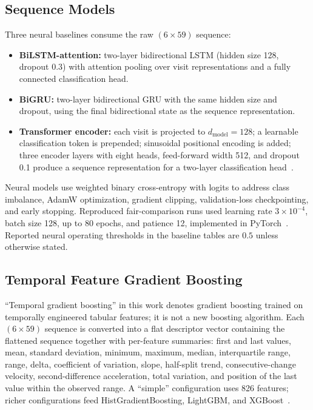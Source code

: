 \documentclass[conference]{IEEEtran}
\begin{document}
\subsection{Sequence Models}
Three neural baselines consume the raw $(6\times 59)$ sequence:
\begin{itemize}
\item \textbf{BiLSTM-attention:} two-layer bidirectional LSTM (hidden size 128, dropout 0.3) with attention pooling over visit representations and a fully connected classification head.
\item \textbf{BiGRU:} two-layer bidirectional GRU with the same hidden size and dropout, using the final bidirectional state as the sequence representation.
\item \textbf{Transformer encoder:} each visit is projected to $d_{\mathrm{model}}=128$; a learnable classification token is prepended; sinusoidal positional encoding is added; three encoder layers with eight heads, feed-forward width 512, and dropout 0.1 produce a sequence representation for a two-layer classification head~\cite{vaswani2017attention}.
\end{itemize}
Neural models use weighted binary cross-entropy with logits to address class imbalance, AdamW optimization, gradient clipping, validation-loss checkpointing, and early stopping. Reproduced fair-comparison runs used learning rate $3\times 10^{-4}$, batch size 128, up to 80 epochs, and patience 12, implemented in PyTorch~\cite{paszke2019pytorch}. Reported neural operating thresholds in the baseline tables are $0.5$ unless otherwise stated.

\subsection{Temporal Feature Gradient Boosting}
``Temporal gradient boosting'' in this work denotes gradient boosting trained on temporally engineered tabular features; it is not a new boosting algorithm. Each $(6\times 59)$ sequence is converted into a flat descriptor vector containing the flattened sequence together with per-feature summaries: first and last values, mean, standard deviation, minimum, maximum, median, interquartile range, range, delta, coefficient of variation, slope, half-split trend, consecutive-change velocity, second-difference acceleration, total variation, and position of the last value within the observed range. A ``simple'' configuration uses 826 features; richer configurations feed HistGradientBoosting, LightGBM, and XGBoost~\cite{chen2016xgboost,ke2017lightgbm,pedregosa2011sklearn}.
\end{document}
